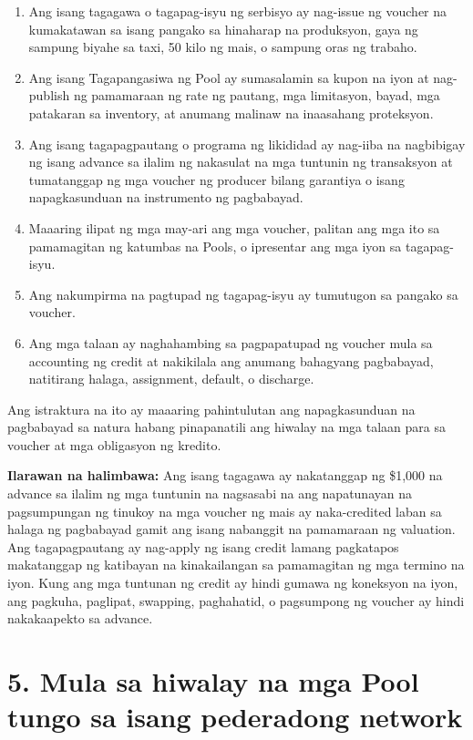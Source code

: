 \documentclass[11pt]{article}
\begin{document}
\begin{enumerate}[leftmargin=*]
\item Ang isang tagagawa o tagapag-isyu ng serbisyo ay nag-issue ng voucher na kumakatawan sa isang pangako sa hinaharap na produksyon, gaya ng sampung biyahe sa taxi, 50 kilo ng mais, o sampung oras ng trabaho.
\item Ang isang Tagapangasiwa ng Pool ay sumasalamin sa kupon na iyon at nag-publish ng pamamaraan ng rate ng pautang, mga limitasyon, bayad, mga patakaran sa inventory, at anumang malinaw na inaasahang proteksyon.
\item Ang isang tagapagpautang o programa ng likididad ay nag-iiba na nagbibigay ng isang advance sa ilalim ng nakasulat na mga tuntunin ng transaksyon at tumatanggap ng mga voucher ng producer bilang garantiya o isang napagkasunduan na instrumento ng pagbabayad.
\item Maaaring ilipat ng mga may-ari ang mga voucher, palitan ang mga ito sa pamamagitan ng katumbas na Pools, o ipresentar ang mga iyon sa tagapag-isyu.
\item Ang nakumpirma na pagtupad ng tagapag-isyu ay tumutugon sa pangako sa voucher.
\item Ang mga talaan ay naghahambing sa pagpapatupad ng voucher mula sa accounting ng credit at nakikilala ang anumang bahagyang pagbabayad, natitirang halaga, assignment, default, o discharge.
\end{enumerate}
Ang istraktura na ito ay maaaring pahintulutan ang napagkasunduan na pagbabayad sa natura habang pinapanatili ang hiwalay na mga talaan para sa voucher at mga obligasyon ng kredito.

\textbf{Ilarawan na halimbawa:} Ang isang tagagawa ay nakatanggap ng \$1,000 na advance sa ilalim ng mga tuntunin na nagsasabi na ang napatunayan na pagsumpungan ng tinukoy na mga voucher ng mais ay naka-credited laban sa halaga ng pagbabayad gamit ang isang nabanggit na pamamaraan ng valuation. Ang tagapagpautang ay nag-apply ng isang credit lamang pagkatapos makatanggap ng katibayan na kinakailangan sa pamamagitan ng mga termino na iyon. Kung ang mga tuntunan ng credit ay hindi gumawa ng koneksyon na iyon, ang pagkuha, paglipat, swapping, paghahatid, o pagsumpong ng voucher ay hindi nakakaapekto sa advance.


\section*{5. Mula sa hiwalay na mga Pool tungo sa isang pederadong network}
\end{document}
